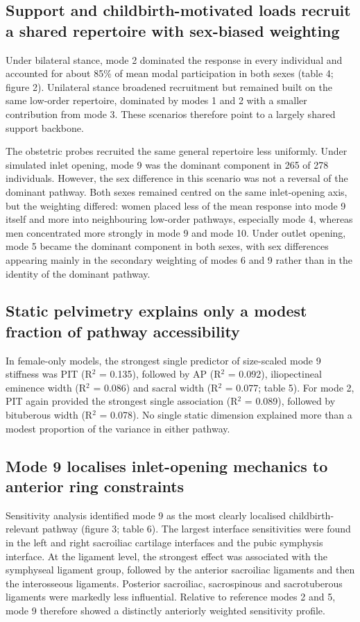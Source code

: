 \documentclass[openacc]{rsproca_new}
\begin{document}
\subsection{Support and childbirth-motivated loads recruit a shared repertoire with sex-biased weighting}
Under bilateral stance, mode 2 dominated the response in every individual and accounted for about 85\% of mean modal participation in both sexes (table 4; figure 2). Unilateral stance broadened recruitment but remained built on the same low-order repertoire, dominated by modes 1 and 2 with a smaller contribution from mode 3. These scenarios therefore point to a largely shared support backbone.

The obstetric probes recruited the same general repertoire less uniformly. Under simulated inlet opening, mode 9 was the dominant component in 265 of 278 individuals. However, the sex difference in this scenario was not a reversal of the dominant pathway. Both sexes remained centred on the same inlet-opening axis, but the weighting differed: women placed less of the mean response into mode 9 itself and more into neighbouring low-order pathways, especially mode 4, whereas men concentrated more strongly in mode 9 and mode 10. Under outlet opening, mode 5 became the dominant component in both sexes, with sex differences appearing mainly in the secondary weighting of modes 6 and 9 rather than in the identity of the dominant pathway.

\subsection{Static pelvimetry explains only a modest fraction of pathway accessibility}
In female-only models, the strongest single predictor of size-scaled mode 9 stiffness was PIT (R$^2$ = 0.135), followed by AP (R$^2$ = 0.092), iliopectineal eminence width (R$^2$ = 0.086) and sacral width (R$^2$ = 0.077; table 5). For mode 2, PIT again provided the strongest single association (R$^2$ = 0.089), followed by bituberous width (R$^2$ = 0.078). No single static dimension explained more than a modest proportion of the variance in either pathway.

\subsection{Mode 9 localises inlet-opening mechanics to anterior ring constraints}
Sensitivity analysis identified mode 9 as the most clearly localised childbirth-relevant pathway (figure 3; table 6). The largest interface sensitivities were found in the left and right sacroiliac cartilage interfaces and the pubic symphysis interface. At the ligament level, the strongest effect was associated with the symphyseal ligament group, followed by the anterior sacroiliac ligaments and then the interosseous ligaments. Posterior sacroiliac, sacrospinous and sacrotuberous ligaments were markedly less influential. Relative to reference modes 2 and 5, mode 9 therefore showed a distinctly anteriorly weighted sensitivity profile.
\end{document}
